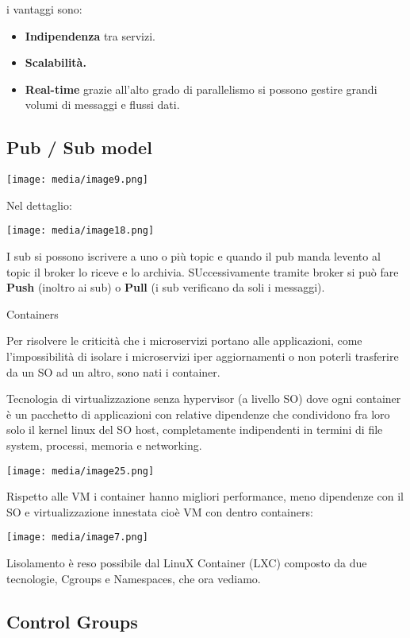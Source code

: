 i vantaggi sono:

\begin{itemize}
\item
  \textbf{Indipendenza} tra servizi.
\item
  \textbf{Scalabilità.}
\item
  \textbf{Real-time} grazie all'alto grado di parallelismo si possono
  gestire grandi volumi di messaggi e flussi dati.
\end{itemize}

\subsection{Pub / Sub model}\label{pub-sub-model}

\texttt{[image: media/image9.png]}

Nel dettaglio:

\texttt{[image: media/image18.png]}

I sub si possono iscrivere a uno o più topic e quando il pub manda
l\textquotesingle evento al topic il broker lo riceve e lo archivia.
SUccessivamente tramite broker si può fare \textbf{Push} (inoltro ai
sub) o \textbf{Pull} (i sub verificano da soli i messaggi).

Containers

Per risolvere le criticità che i microservizi portano alle applicazioni,
come l'impossibilità di isolare i microservizi iper aggiornamenti o non
poterli trasferire da un SO ad un altro, sono nati i container.

Tecnologia di virtualizzazione senza hypervisor (a livello SO) dove ogni
container è un pacchetto di applicazioni con relative dipendenze che
condividono fra loro solo il kernel linux del SO host, completamente
indipendenti in termini di file system, processi, memoria e networking.

\texttt{[image: media/image25.png]}

Rispetto alle VM i container hanno migliori performance, meno dipendenze
con il SO e virtualizzazione innestata cioè VM con dentro containers:

\texttt{[image: media/image7.png]}

L\textquotesingle isolamento è reso possibile dal LinuX Container (LXC)
composto da due tecnologie, Cgroups e Namespaces, che ora vediamo.

\subsection{Control Groups}\label{control-groups}

